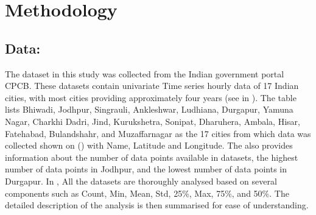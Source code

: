 
\chapter{Methodology} %

\label{c4} %


\section{Data: }
The dataset in this study was collected from the Indian government portal CPCB. These datasets contain univariate Time series hourly data of 17 Indian cities,  with most cities providing approximately four years (see in ). The table lists Bhiwadi,  Jodhpur,  Singrauli,  Ankleshwar,  Ludhiana,  Durgapur,  Yamuna Nagar,  Charkhi Dadri,  Jind,  Kurukshetra,  Sonipat,  Dharuhera,  Ambala,  Hisar,  Fatehabad,  Bulandshahr,  and Muzaffarnagar as the 17 cities from which data was collected shown on () with Name,  Latitude and Longitude. The  also provides information about the number of data points available in datasets, the highest number of data points in Jodhpur, and the lowest number of data points in Durgapur. In , All the datasets are thoroughly analysed based on several components such as Count, Min,  Mean,  Std,   25\%, Max,  75\%,  and 50\%. The detailed description of the analysis is then summarised for ease of understanding.




